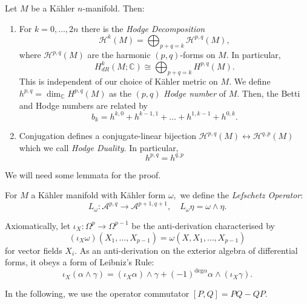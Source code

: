 \begin{theorem}

Let $M$ be a K\"ahler $n$-manifold. Then:

\begin{enumerate}
    \item For $k = 0, \dots, 2n$ there is the \textit{Hodge Decomposition}
    \[
    \mathcal{H}^k(M) = \bigoplus_{p+q = k}\mathcal{H}^{p,q}(M),
    \]
    where $\mathcal{H}^{p,q}(M)$ are the harmonic $(p,q)$-forms on $M.$ In particular,
    \[
    H_{dR}^{k}(M;\mathbb{C}) \cong  \bigoplus_{p+q = k} H^{p,q}(M).
    \]
    This is independent of our choice of K\"ahler metric on $M.$ We define $h^{p,q} = \dim_{\mathbb{C}} H^{p,q}(M)$ as the $(p,q)$ \textit{Hodge number} of $M.$ Then, the Betti and Hodge numbers are related by
    \[
    b_k = h^{k, 0} + h^{k-1, 1} + \dots + h^{1,k-1} + h^{0,k}.
    \]

    \item Conjugation defines a conjugate-linear bijection $\mathcal{H}^{p,q}(M) \leftrightarrow \mathcal{H}^{q,p}(M)$ which we call \textit{Hodge Duality}. In particular,
    \[
    h^{p,q} = h^{q,p}
    \]
\end{enumerate}
\end{theorem}

\noindent We will need some lemmata for the proof.

\begin{definition}
    For $M$ a K\"ahler manifold with K\"ahler form $\omega,$ we define the \textit{Lefschetz Operator}:
    \[
    L_\omega : \mathcal{A}^{p,q} \rightarrow \mathcal{A}^{p+1,q+1}, \quad L_\omega\eta = \omega \wedge \eta.
    \]
\end{definition}

\begin{definition}
    Axiomatically, let $\iota_X:\Omega^p\rightarrow \Omega^{p-1}$ be the anti-derivation characterised by 
    \[
    (\iota_X\omega)(X_1, \dots, X_{p-1}) = \omega(X, X_1, \dots, X_{p-1})
    \]
    for vector fields $X_i.$ As an anti-derivation on the exterior algebra of differential forms, it obeys a form of Leibniz's Rule:
    \[
    \iota_X(\alpha \wedge \gamma) = (\iota_X \alpha)\wedge \gamma + (-1)^{\text{deg}\alpha}\alpha \wedge (\iota_X\gamma).
    \]
\end{definition}


\noindent In the following, we use the operator commutator $[P,Q] = P Q - Q P.$

